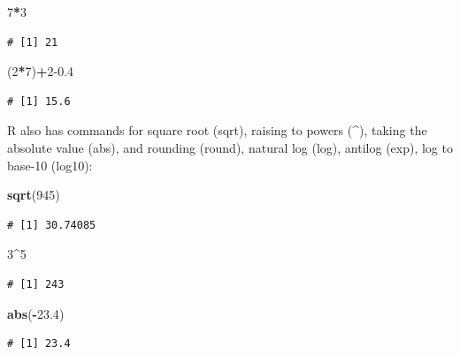 \documentclass[
  a4paperpaper,
]{book}
\newenvironment{Shaded}{\begin{snugshade}}{\end{snugshade}}
\newcommand{\DecValTok}[1]{\textcolor[rgb]{0.00,0.00,0.81}{#1}}
\newcommand{\FloatTok}[1]{\textcolor[rgb]{0.00,0.00,0.81}{#1}}
\newcommand{\KeywordTok}[1]{\textcolor[rgb]{0.13,0.29,0.53}{\textbf{#1}}}
\newcommand{\NormalTok}[1]{#1}
\newcommand{\OperatorTok}[1]{\textcolor[rgb]{0.81,0.36,0.00}{\textbf{#1}}}
\begin{document}
\begin{Shaded}
\begin{Highlighting}[]
\DecValTok{7}\OperatorTok{*}\DecValTok{3}
\end{Highlighting}
\end{Shaded}

\begin{verbatim}
# [1] 21
\end{verbatim}

\begin{Shaded}
\begin{Highlighting}[]
\NormalTok{(}\DecValTok{2}\OperatorTok{*}\DecValTok{7}\NormalTok{)}\OperatorTok{+}\DecValTok{2}\FloatTok{{-}0.4}
\end{Highlighting}
\end{Shaded}

\begin{verbatim}
# [1] 15.6
\end{verbatim}

R also has commands for square root (sqrt), raising to powers (\^{}), taking the absolute value (abs), and rounding (round), natural log (log), antilog (exp), log to base-10 (log10):

\begin{Shaded}
\begin{Highlighting}[]
\KeywordTok{sqrt}\NormalTok{(}\DecValTok{945}\NormalTok{)}
\end{Highlighting}
\end{Shaded}

\begin{verbatim}
# [1] 30.74085
\end{verbatim}

\begin{Shaded}
\begin{Highlighting}[]
\DecValTok{3}\OperatorTok{\^{}}\DecValTok{5}
\end{Highlighting}
\end{Shaded}

\begin{verbatim}
# [1] 243
\end{verbatim}

\begin{Shaded}
\begin{Highlighting}[]
\KeywordTok{abs}\NormalTok{(}\OperatorTok{{-}}\FloatTok{23.4}\NormalTok{)}
\end{Highlighting}
\end{Shaded}

\begin{verbatim}
# [1] 23.4
\end{verbatim}
\end{document}
